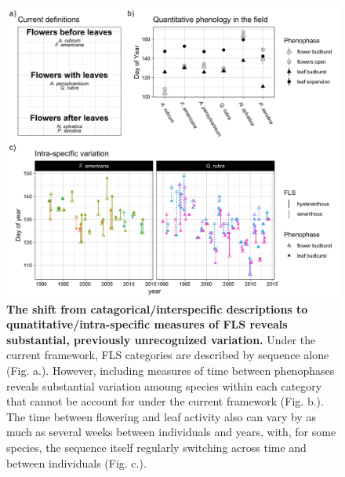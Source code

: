 \documentclass{article}
\begin{document}
 \begin{figure}[h!]
        \centering
          \includegraphics[width=\textwidth]{..//HarvardForest/FLS_viz.jpeg}
          \caption{\textbf{The shift from catagorical/interspecific descriptions to qunatitative/intra-specific measures of FLS reveals substantial, previously unrecognized variation.} Under the current framework, FLS categories are described by sequence alone (Fig. a.). However, including measures of time between phenophases reveals substantial variation amoung species within each category that cannot be account for under the current framework (Fig. b.).  The time between flowering and leaf activity also can vary by as much as several weeks between individuals and years, with, for some species, the sequence itself regularly switching across time and between individuals (Fig. c.). }
        \label{fig:vizzy}
    \end{figure}
    
\end{document}
